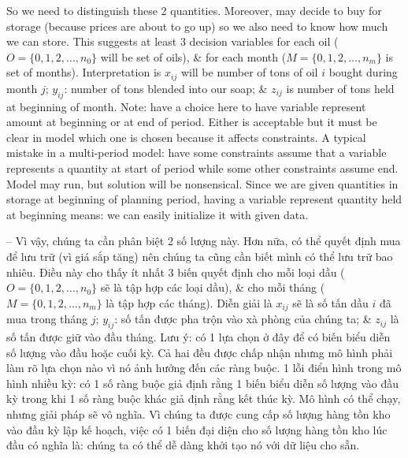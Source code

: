 \documentclass{article}
\begin{document}
\begin{itemize}
\begin{itemize}
\begin{itemize}
\begin{itemize}
                So we need to distinguish these 2 quantities. Moreover, may decide to buy for storage (because prices are about to go up) so we also need to know how much we can store. This suggests at least 3 decision variables for each oil ($O = \{0,1,2,\ldots,n_0\}$ will be set of oils), \& for each month ($M = \{0,1,2,\ldots,n_m\}$ is set of months). Interpretation is $x_{ij}$ will be number of tons of oil $i$ bought during month $j$; $y_{ij}$: number of tons blended into our soap; \& $z_{ij}$ is number of tons held at beginning of month. Note: have a choice here to have variable represent amount at beginning or at end of period. Either is acceptable but it must be clear in model which one is chosen because it affects constraints. A typical mistake in a multi-period model: have some constraints assume that a variable represents a quantity at start of period while some other constraints assume end. Model may run, but solution will be nonsensical. Since we are given quantities in storage at beginning of planning period, having a variable represent quantity held at beginning means: we can easily initialize it with given data.

                -- Vì vậy, chúng ta cần phân biệt 2 số lượng này. Hơn nữa, có thể quyết định mua để lưu trữ (vì giá sắp tăng) nên chúng ta cũng cần biết mình có thể lưu trữ bao nhiêu. Điều này cho thấy ít nhất 3 biến quyết định cho mỗi loại dầu ($O = \{0,1,2,\ldots,n_0\}$ sẽ là tập hợp các loại dầu), \& cho mỗi tháng ($M = \{0,1,2,\ldots,n_m\}$ là tập hợp các tháng). Diễn giải là $x_{ij}$ sẽ là số tấn dầu $i$ đã mua trong tháng $j$; $y_{ij}$: số tấn được pha trộn vào xà phòng của chúng ta; \& $z_{ij}$ là số tấn được giữ vào đầu tháng. Lưu ý: có 1 lựa chọn ở đây để có biến biểu diễn số lượng vào đầu hoặc cuối kỳ. Cả hai đều được chấp nhận nhưng mô hình phải làm rõ lựa chọn nào vì nó ảnh hưởng đến các ràng buộc. 1 lỗi điển hình trong mô hình nhiều kỳ: có 1 số ràng buộc giả định rằng 1 biến biểu diễn số lượng vào đầu kỳ trong khi 1 số ràng buộc khác giả định rằng kết thúc kỳ. Mô hình có thể chạy, nhưng giải pháp sẽ vô nghĩa. Vì chúng ta được cung cấp số lượng hàng tồn kho vào đầu kỳ lập kế hoạch, việc có 1 biến đại diện cho số lượng hàng tồn kho lúc đầu có nghĩa là: chúng ta có thể dễ dàng khởi tạo nó với dữ liệu cho sẵn.


\end{itemize}
\end{itemize}
\end{itemize}
\end{itemize}
\end{document}
